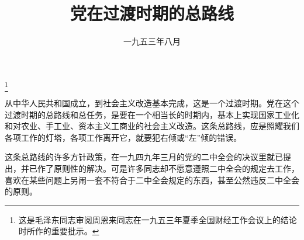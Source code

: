 
\title{党在过渡时期的总路线}
\date{一九五三年八月}
\thanks{这是毛泽东同志审阅周恩来同志在一九五三年夏季全国财经工作会议上的结论时所作的重要批示。}
\maketitle


从中华人民共和国成立，到社会主义改造基本完成，这是一个过渡时期。党在这个过渡时期的总路线和总任务，是要在一个相当长的时期内，基本上实现国家工业化和对农业、手工业、资本主义工商业的社会主义改造。这条总路线，应是照耀我们各项工作的灯塔，各项工作离开它，就要犯右倾或“左”倾的错误。

这条总路线的许多方针政策，在一九四九年三月的党的二中全会的决议里就已提出，并已作了原则性的解决。可是许多同志却不愿意遵照二中全会的规定去工作，喜欢在某些问题上另闹一套不符合于二中全会规定的东西，甚至公然违反二中全会的原则。
